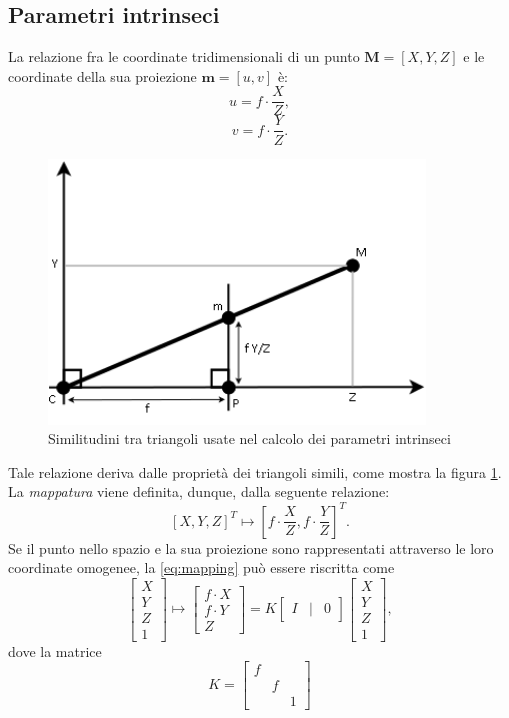 \subsection{Parametri intrinseci}
\label{intrinsicParam}
La relazione fra le coordinate tridimensionali di un punto $\textbf{M}=[X,Y,Z]$ e le coordinate della sua proiezione $\textbf{m}=[u,v]$ \`e:
\[u=f\cdot \frac{X}{Z},\]
\[v=f\cdot \frac{Y}{Z}.\]
\begin{figure}[tb]
	\centering
	\includegraphics[width=10cm]{./pictures/mappatura2d3d}
	\caption{Similitudini tra triangoli usate nel calcolo dei parametri intrinseci}
	\label{fig:mapping}
\end{figure}
\noindent Tale relazione deriva dalle propriet\`a dei triangoli simili, come mostra la figura \ref{fig:mapping}.
La \textit{mappatura} viene definita, dunque, dalla seguente relazione:
\begin{equation}
\label{eq:mapping}
[X,Y,Z]^\textit{T} \mapsto \left[f\cdot \frac{X}{Z}, f\cdot \frac{Y}{Z}\right]^\textit{T}.
\end{equation} 
Se il punto nello spazio e la sua proiezione sono rappresentati attraverso le loro coordinate omogenee, la \eqref{eq:mapping} pu\`o essere riscritta come
\begin{equation}
\label{eq:mappingMatrix}
\left[\begin{array}{c}
X \\ Y \\ Z \\ 1
\end{array}\right] \mapsto 
\left[\begin{array}{c}
f \cdot X \\ f \cdot Y \\ Z
\end{array}\right] = 
K \left[\begin{array}{rcl}
I & | & 0
\end{array}\right]
\left[\begin{array}{c}
X \\ Y \\ Z \\ 1
\end{array}\right],
\end{equation}
dove la matrice
\begin{equation}
\label{eq:kSimple}
K = 
\left[\begin{array}{rccl}
f & & \\
& f & \\
& & 1 
\end{array}\right]
\end{equation}


